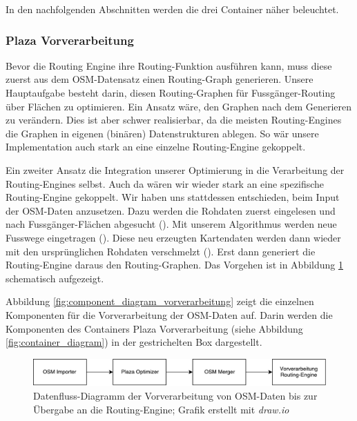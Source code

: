 In den nachfolgenden Abschnitten werden die drei Container näher beleuchtet.


\subsubsection{Plaza Vorverarbeitung}
\label{architektur:Plaza Vorverarbeitung}

Bevor die Routing Engine ihre Routing-Funktion ausführen kann, muss diese zuerst aus dem \ac{OSM}-Datensatz einen Routing-Graph generieren. Unsere Hauptaufgabe besteht darin, diesen Routing-Graphen für Fussgänger-Routing über Flächen zu optimieren. Ein Ansatz wäre, den Graphen nach dem Generieren zu verändern. Dies ist aber schwer realisierbar, da die meisten Routing-Engines die Graphen in eigenen (binären) Datenstrukturen ablegen. So wär unsere Implementation auch stark an eine einzelne Routing-Engine gekoppelt.

Ein zweiter Ansatz die Integration unserer Optimierung in die Verarbeitung der Routing-Engines selbst. Auch da wären wir wieder stark an eine spezifische Routing-Engine gekoppelt.
Wir haben uns stattdessen entschieden, beim Input der \ac{OSM}-Daten anzusetzen. Dazu werden die Rohdaten zuerst eingelesen und nach Fussgänger-Flächen abgesucht (). Mit unserem Algorithmus werden neue Fusswege eingetragen (). Diese neu erzeugten Kartendaten werden dann wieder mit den ursprünglichen Rohdaten verschmelzt (). Erst dann generiert die Routing-Engine daraus den Routing-Graphen. Das Vorgehen ist in Abbildung \ref{fig:dataflow_vorverarbeitung} schematisch aufgezeigt.

Abbildung \ref{fig:component_diagram_vorverarbeitung} zeigt die einzelnen Komponenten für die Vorverarbeitung der \ac{OSM}-Daten auf. Darin werden die Komponenten des Containers Plaza Vorverarbeitung (siehe Abbildung \ref{fig:container_diagram}) in der gestrichelten Box dargestellt.


\begin{figure}[ht]
    \centering
    \includegraphics[width=1\linewidth]{projectdoc/img/dataflow_vorverarbeitung.pdf}
    \caption[Datenfluss Vorverarbeitung]{Datenfluss-Diagramm der Vorverarbeitung von \ac{OSM}-Daten bis zur Übergabe an die Routing-Engine; Grafik erstellt mit \emph{draw.io}}
    \label{fig:dataflow_vorverarbeitung}
\end{figure}
    

